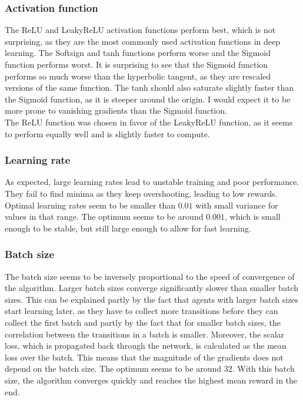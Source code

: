 \subsubsection{Activation function}
The ReLU and LeakyReLU activation functions perform best, which is not surprising, as they are the most commonly used activation functions in deep learning. The Softsign and tanh functions perform worse and the Sigmoid function performs worst. It is surprising to see that the Sigmoid function performs so much worse than the hyperbolic tangent, as they are rescaled versions of the same function. The tanh should also saturate slightly faster than the Sigmoid function, as it is steeper around the origin. I would expect it to be more prone to vanishing gradients than the Sigmoid function. \\
The ReLU function was chosen in favor of the LeakyReLU function, as it seems to perform equally well and is slightly faster to compute.

\subsubsection{Learning rate}
As expected, large learning rates lead to unstable training and poor performance. They fail to find minima as they keep overshooting, leading to low rewards. Optimal learning rates seem to be smaller than $0.01$ with small variance for values in that range. The optimum seems to be around $0.001$, which is small enough to be stable, but still large enough to allow for fast learning. 

\subsubsection{Batch size}
The batch size seems to be inversely proportional to the speed of convergence of the algorithm. Larger batch sizes converge significantly slower than smaller batch sizes. This can be explained partly by the fact that agents with larger batch sizes start learning later, as they have to collect more transitions before they can collect the first batch and partly by the fact that for smaller batch sizes, the correlation between the transitions in a batch is smaller. Moreover, the scalar loss, which is propagated back through the network, is calculated as the mean loss over the batch. This means that the magnitude of the gradients does not depend on the batch size. The optimum seems to be around $32$. With this batch size, the algorithm converges quickly and reaches the highest mean reward in the end.

